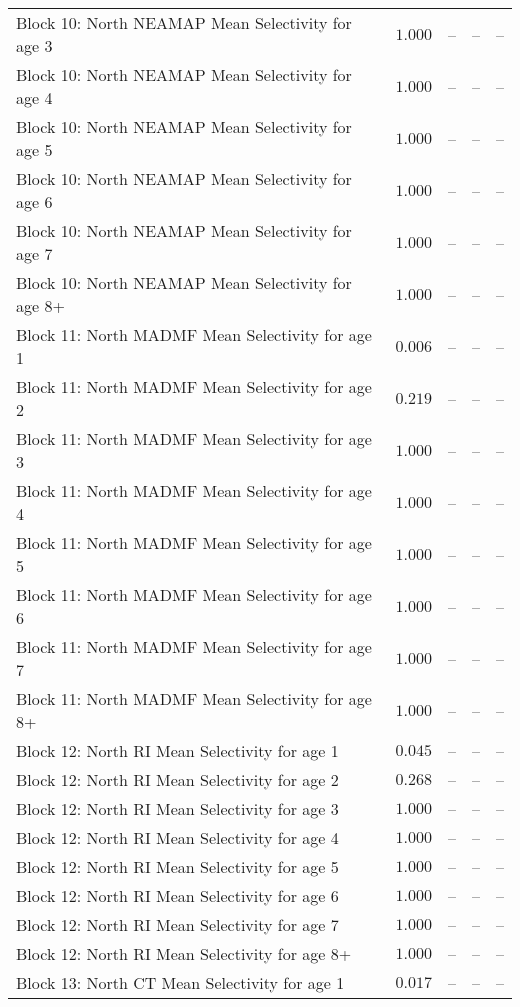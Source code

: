 \documentclass[
]{article}
\begin{document}
\begin{landscape}
\begin{longtable}[t]{lrrrr}
Block 10: North NEAMAP Mean Selectivity for age 3 & $1.000$ & -- & -- & --\\
Block 10: North NEAMAP Mean Selectivity for age 4 & $1.000$ & -- & -- & --\\
Block 10: North NEAMAP Mean Selectivity for age 5 & $1.000$ & -- & -- & --\\
Block 10: North NEAMAP Mean Selectivity for age 6 & $1.000$ & -- & -- & --\\
\addlinespace
Block 10: North NEAMAP Mean Selectivity for age 7 & $1.000$ & -- & -- & --\\
Block 10: North NEAMAP Mean Selectivity for age 8+ & $1.000$ & -- & -- & --\\
Block 11: North MADMF Mean Selectivity for age 1 & $0.006$ & -- & -- & --\\
Block 11: North MADMF Mean Selectivity for age 2 & $0.219$ & -- & -- & --\\
Block 11: North MADMF Mean Selectivity for age 3 & $1.000$ & -- & -- & --\\
\addlinespace
Block 11: North MADMF Mean Selectivity for age 4 & $1.000$ & -- & -- & --\\
Block 11: North MADMF Mean Selectivity for age 5 & $1.000$ & -- & -- & --\\
Block 11: North MADMF Mean Selectivity for age 6 & $1.000$ & -- & -- & --\\
Block 11: North MADMF Mean Selectivity for age 7 & $1.000$ & -- & -- & --\\
Block 11: North MADMF Mean Selectivity for age 8+ & $1.000$ & -- & -- & --\\
\addlinespace
Block 12: North RI Mean Selectivity for age 1 & $0.045$ & -- & -- & --\\
Block 12: North RI Mean Selectivity for age 2 & $0.268$ & -- & -- & --\\
Block 12: North RI Mean Selectivity for age 3 & $1.000$ & -- & -- & --\\
Block 12: North RI Mean Selectivity for age 4 & $1.000$ & -- & -- & --\\
Block 12: North RI Mean Selectivity for age 5 & $1.000$ & -- & -- & --\\
\addlinespace
Block 12: North RI Mean Selectivity for age 6 & $1.000$ & -- & -- & --\\
Block 12: North RI Mean Selectivity for age 7 & $1.000$ & -- & -- & --\\
Block 12: North RI Mean Selectivity for age 8+ & $1.000$ & -- & -- & --\\
Block 13: North CT Mean Selectivity for age 1 & $0.017$ & -- & -- & --\\

\end{longtable}
\end{landscape}
\end{document}
